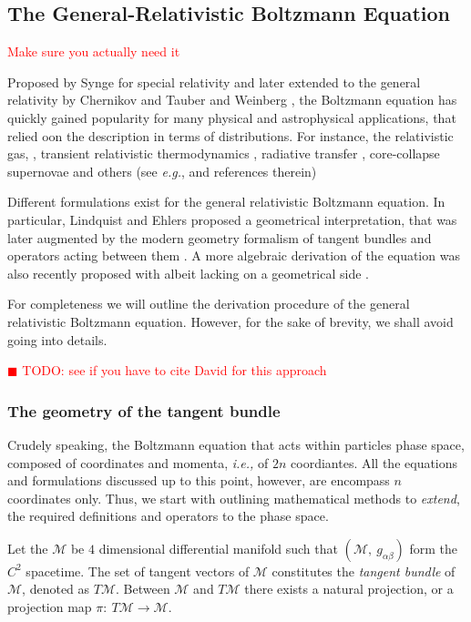 \documentclass[11pt,a4paper,headinclude=true,DIV=14,BCOR=8mm,chapterprefix,listof=totoc,twoside,openright,abstracton]{scrbook}
\newcommand{\todo}[1]{\textcolor{red}{$\blacksquare$ TODO: #1}}
\newcommand{\red}[1]{\textcolor{red}{#1}}
\begin{document}

\subsection{The General-Relativistic Boltzmann Equation}
\red{Make sure you actually need it}

Proposed by Synge \cite{Synge:1957} for special relativity and later extended to the general relativity by Chernikov \cite{Chernikov:1962} and Tauber and Weinberg \cite{Tauber:1961}, the Boltzmann equation has quickly gained popularity for many physical and astrophysical applications, that relied oon the description in terms of distributions. For instance, the relativistic gas, \cite{Israel:1963}, transient relativistic thermodynamics \cite{Israel:1979wp}, radiative transfer \cite{Lindquist:1966}, core-collapse supernovae \cite{Bruenn:1985} and others (see \textit{e.g.}, \cite{Cercignani:2002} and references therein)

Different formulations exist for the general relativistic Boltzmann equation. In particular, Lindquist \cite{Lindquist:1966} and Ehlers \cite{Ehlers:1971} proposed a geometrical interpretation, that was later augmented by the modern geometry formalism of tangent bundles and operators acting between them \cite{Sasaki:1958,Sasaki:1962}. A more algebraic derivation of the equation was also recently proposed with albeit lacking on a geometrical side \cite{Debbasch:2009a,Debbasch:2009b}. 

For completeness we will outline the derivation procedure of the general relativistic Boltzmann equation. However, for the sake of brevity, we shall avoid going into details.

\todo{see if you have to cite David for this approach}


\subsubsection{The geometry of the tangent bundle}

Crudely speaking, the Boltzmann equation that acts within particles phase space, composed of coordinates and momenta, \textit{i.e.,} of $2n$ coordiantes. All the equations and formulations discussed up to this point, however, are encompass $n$ coordinates only. Thus, we start with outlining mathematical methods to \textit{extend}, the required definitions and operators to the phase space.

Let the $\mathcal{M}$ be $4$ dimensional differential manifold such that $(\mathcal{M},\: g_{\alpha\beta})$ form the $C^2$ spacetime. The set of tangent vectors of $\mathcal{M}$ constitutes the \textit{tangent bundle} of $\mathcal{M}$, denoted as $T\mathcal{M}$. Between $\mathcal{M}$ and $T\mathcal{M}$ there exists a natural projection, or a projection map $\pi:\: T\mathcal{M}\rightarrow\mathcal{M}$. 
\end{document}

